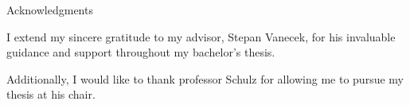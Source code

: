 \thispagestyle{empty}

\vspace*{20mm}

\begin{center}
{ Acknowledgments}
\end{center}

\vspace{10mm}

I extend my sincere gratitude to my advisor, Stepan Vanecek, for his invaluable guidance and support throughout my bachelor's thesis.

Additionally, I would like to thank professor Schulz for allowing me to pursue my thesis at his chair.

\cleardoublepage{}
